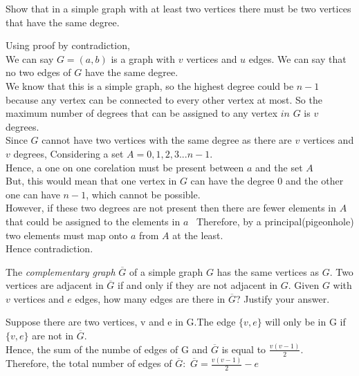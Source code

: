 \documentclass[addpoints]{exam}
\begin{document}
\begin{questions}

\question[5] Show that in a simple graph with at least two vertices there must be two vertices that have the same degree.
  \begin{solution}
    Using proof by contradiction,  \\
      We can say $G = (a, b)$ is a graph with $v$ vertices and $u$ edges. 
      We can say that no two edges of $G$ have the same degree. \\
      We know that this is a simple graph, so the highest degree could be $n-1$ because any vertex can be connected to every other vertex at most.
      So the maximum number of degrees that can be assigned to any vertex $in$ $G$ is $v$ degrees. \\
      Since $G$ cannot have two vertices with the same degree as there are $v$ vertices and $v$ degrees, 
      Considering a set $A={0,1,2,3... n-1}$.\\
      Hence, a one on one corelation must be present between $a$ and the set $A$\\
      But, this would mean that one vertex in $G$ can have the degree 0 and the other one can have $n-1$, which cannot be possible.\\
      However, if these two degrees are not present then there are fewer elements in $A$ that could be assigned to the elements in $a$ \
      Therefore, by a principal(pigeonhole) two elements must map onto $a$ from $A$ at the least. 
      \\Hence contradiction.
    
  \end{solution}
  
\question[5] The \textit{complementary graph} $\overline{G}$ of a simple graph $G$ has the same vertices as  $G$. Two vertices are adjacent in $\overline{G}$ if and only if they are not adjacent in $G$. Given $G$ with $v$ vertices and $e$ edges, how many edges are there in $\overline{G}$? Justify your answer.
  \begin{solution}
  Suppose there are two vertices, v and e  in G.The edge $\{v, e\} $ will only be in G if $\{v, e\} $ are not in $\overline{G}$.
 \\ Hence, the sum of the numbe of edges of G and $\overline{G}$ is equal to $\frac{v(v-1)}{2}$.\\
  Therefore, the total number of edges of $\overline{G}:$
  $\overline{G} = \frac{v(v-1)}{2} - e$



\end{solution}
\end{questions}
\end{document}
